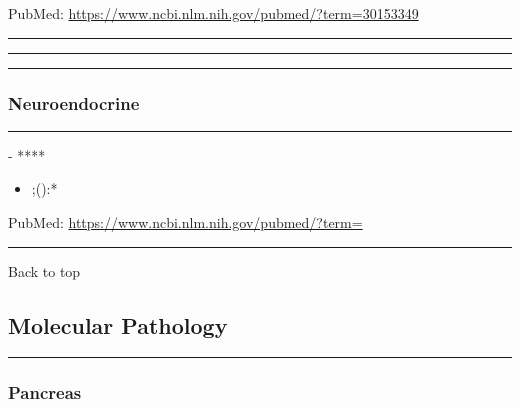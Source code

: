 \documentclass[]{article}
\providecommand{\tightlist}{%
  \setlength{\itemsep}{0pt}\setlength{\parskip}{0pt}}
\begin{document}
PubMed: \url{https://www.ncbi.nlm.nih.gov/pubmed/?term=30153349}

{}

{}

\begin{center}\rule{0.5\linewidth}{\linethickness}\end{center}

\begin{center}\rule{0.5\linewidth}{\linethickness}\end{center}

\begin{center}\rule{0.5\linewidth}{\linethickness}\end{center}

\hypertarget{neuroendocrine-1}{%
\subsubsection{Neuroendocrine}\label{neuroendocrine-1}}

\begin{center}\rule{0.5\linewidth}{\linethickness}\end{center}

 - ****

\begin{itemize}
\tightlist
\item
  ;():*
\end{itemize}

PubMed: \url{https://www.ncbi.nlm.nih.gov/pubmed/?term=}

{}

{}

\begin{center}\rule{0.5\linewidth}{\linethickness}\end{center}

Back to top

\pagebreak

\hypertarget{molecular-pathology}{%
\subsection{Molecular Pathology}\label{molecular-pathology}}

\begin{center}\rule{0.5\linewidth}{\linethickness}\end{center}

\hypertarget{pancreas-2}{%
\subsubsection{Pancreas}\label{pancreas-2}}
\end{document}
